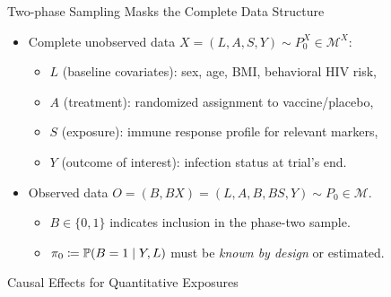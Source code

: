 \documentclass{beamer}
\begin{document}

\begin{frame}[c]{Two-phase Sampling Masks the Complete Data Structure}

\begin{center}
\begin{itemize}
  \itemsep8pt
  \item Complete unobserved data $X = (L, A, S, Y) \sim P_0^X \in
    \mathcal{M}^X$:
    \begin{itemize}
      \itemsep4pt
      \item $L$ (baseline covariates): sex, age, BMI, behavioral HIV risk,
      \item $A$ (treatment): randomized assignment to vaccine/placebo,
      \item $S$ (exposure): immune response profile for relevant markers,
      \item $Y$ (outcome of interest): infection status at trial's end.
    \end{itemize}
  \item Observed data $O = (B, BX) = (L, A, B, BS, Y) \sim P_0 \in \mathcal{M}$.
    \begin{itemize}
      \itemsep4pt
      \item $B \in \{0,1\}$ indicates inclusion in the phase-two sample.
      \item $\pi_0 \coloneqq \mathbb{P}(B = 1 \mid Y, L)$ must be \textit{known by
        design} or estimated.
    \end{itemize}
\end{itemize}
\end{center}


\end{frame}


\begin{frame}[standout]
  Causal Effects for Quantitative Exposures
\end{frame}
\end{document}
